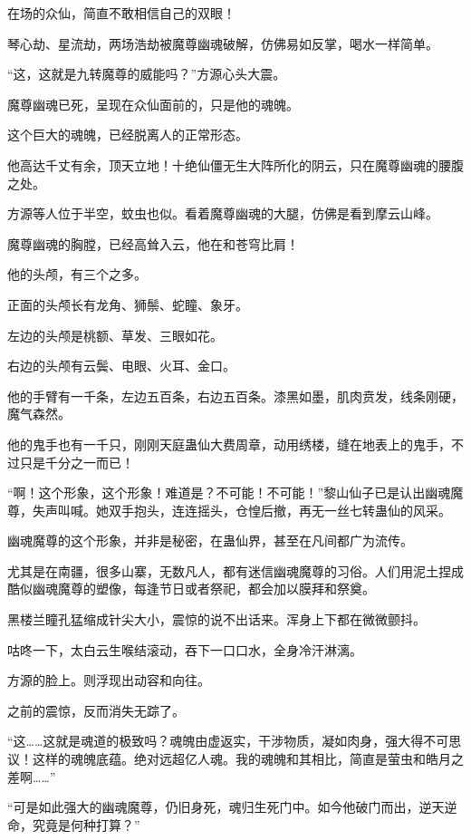 
\begin{this_body}

在场的众仙，简直不敢相信自己的双眼！

琴心劫、星流劫，两场浩劫被魔尊幽魂破解，仿佛易如反掌，喝水一样简单。

“这，这就是九转魔尊的威能吗？”方源心头大震。

魔尊幽魂已死，呈现在众仙面前的，只是他的魂魄。

这个巨大的魂魄，已经脱离人的正常形态。

他高达千丈有余，顶天立地！十绝仙僵无生大阵所化的阴云，只在魔尊幽魂的腰腹之处。

方源等人位于半空，蚊虫也似。看着魔尊幽魂的大腿，仿佛是看到摩云山峰。

魔尊幽魂的胸膛，已经高耸入云，他在和苍穹比肩！

他的头颅，有三个之多。

正面的头颅长有龙角、狮鬃、蛇瞳、象牙。

左边的头颅是桃额、草发、三眼如花。

右边的头颅有云鬓、电眼、火耳、金口。

他的手臂有一千条，左边五百条，右边五百条。漆黑如墨，肌肉贲发，线条刚硬，魔气森然。

他的鬼手也有一千只，刚刚天庭蛊仙大费周章，动用绣楼，缝在地表上的鬼手，不过只是千分之一而已！

“啊！这个形象，这个形象！难道是？不可能！不可能！”黎山仙子已是认出幽魂魔尊，失声叫喊。她双手抱头，连连摇头，仓惶后撤，再无一丝七转蛊仙的风采。

幽魂魔尊的这个形象，并非是秘密，在蛊仙界，甚至在凡间都广为流传。

尤其是在南疆，很多山寨，无数凡人，都有迷信幽魂魔尊的习俗。人们用泥土捏成酷似幽魂魔尊的塑像，每逢节日或者祭祀，都会加以膜拜和祭奠。

黑楼兰瞳孔猛缩成针尖大小，震惊的说不出话来。浑身上下都在微微颤抖。

咕咚一下，太白云生喉结滚动，吞下一口口水，全身冷汗淋漓。

方源的脸上。则浮现出动容和向往。

之前的震惊，反而消失无踪了。

“这……这就是魂道的极致吗？魂魄由虚返实，干涉物质，凝如肉身，强大得不可思议！这样的魂魄底蕴。绝对远超亿人魂。我的魂魄和其相比，简直是萤虫和皓月之差啊……”

“可是如此强大的幽魂魔尊，仍旧身死，魂归生死门中。如今他破门而出，逆天逆命，究竟是何种打算？”


\end{this_body}
